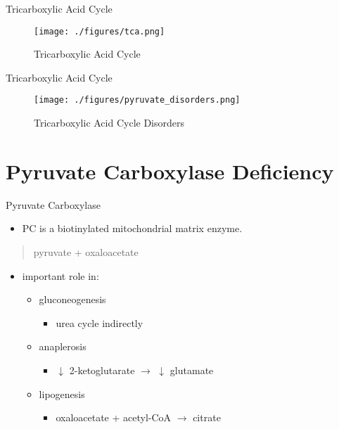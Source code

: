 \documentclass[presentation, smaller]{beamer}
\begin{document}
\begin{frame}[label={sec:orgbd1d733}]{Tricarboxylic Acid Cycle}
\begin{figure}[htbp]
\centering
\texttt{[image: ./figures/tca.png]}
\caption[TCA]{\label{fig:orgafdecd9}
Tricarboxylic Acid Cycle}
\end{figure}
\end{frame}

\begin{frame}[label={sec:org95f450b}]{Tricarboxylic Acid Cycle}
\begin{figure}[htbp]
\centering
\texttt{[image: ./figures/pyruvate\_disorders.png]}
\caption[TCA]{\label{fig:org8f1c4b2}
Tricarboxylic Acid Cycle Disorders}
\end{figure}
\end{frame}

\section{Pyruvate Carboxylase Deficiency}
\label{sec:orge347ffa}
\begin{frame}[label={sec:org4ce7072}]{Pyruvate Carboxylase}
\begin{itemize}
\item PC is a biotinylated mitochondrial matrix enzyme.
\end{itemize}
\begin{quotation} %
pyruvate +  oxaloacetate
\end{quotation}

\begin{itemize}
\item important role in:
\begin{itemize}
\item gluconeogenesis
\begin{itemize}
\item urea cycle indirectly
\end{itemize}
\item anaplerosis
\begin{itemize}
\item \(\downarrow\) 2-ketoglutarate \(\to\) \(\downarrow\) glutamate
\end{itemize}
\item lipogenesis
\begin{itemize}
\item oxaloacetate + acetyl-CoA \(\to\) citrate
\end{itemize}
\end{itemize}
\end{itemize}
\end{frame}
\end{document}
